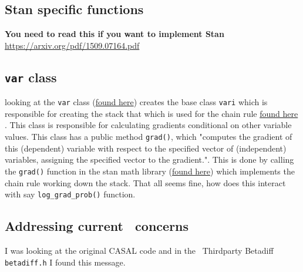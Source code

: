 \subsection{Stan specific functions}
\textbf{You need to read this if you want to implement Stan} \url{https://arxiv.org/pdf/1509.07164.pdf}
\subsection{\texttt{var} class}
looking at the \texttt{var} class (\href{https://github.com/stan-dev/math/blob/develop/stan/math/rev/core/var.hpp}{found here}) creates the base class \texttt{vari} which is responsible for creating the stack that which is used for the chain rule \href{https://github.com/stan-dev/math/blob/develop/stan/math/rev/core/vari.hpp}{found here} . This class is responsible for calculating gradients conditional on other variable values. This class has a public method \texttt{grad()}, which "computes the gradient of this (dependent) variable with respect to the specified vector of (independent) variables, assigning the specified vector to the gradient.". This is done by calling the \texttt{grad()} function in the stan math library (\href{https://github.com/stan-dev/math/blob/develop/stan/math/rev/core/grad.hpp}{found here}) which implements the chain rule working down the stack. That all seems fine, how does this interact with say \texttt{log\_grad\_prob()} function.




\subsection{Addressing current \CNAME\ concerns}
I was looking at the original CASAL code and in the \CNAME\ Thirdparty Betadiff \texttt{betadiff.h} I found this message.

